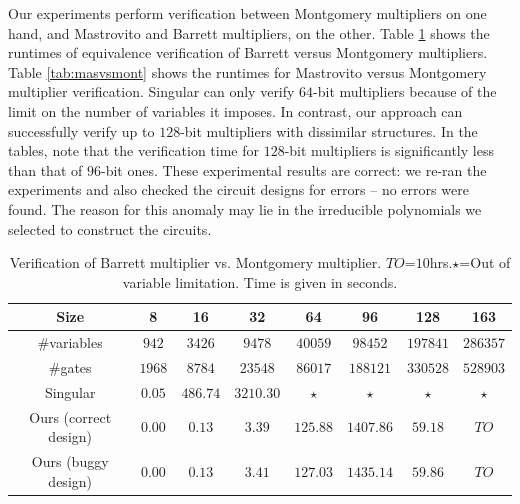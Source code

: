 Our experiments perform verification between Montgomery multipliers on
one hand, and  Mastrovito and Barrett multipliers, on the other. Table
\ref{tab:bvsmont} shows the runtimes of equivalence verification of
Barrett versus Montgomery multipliers. Table \ref{tab:masvsmont} shows
the runtimes for Mastrovito versus Montgomery multiplier verification.  
Singular can only verify $64$-bit multipliers because of the limit on
the number of variables it imposes. In contrast, our approach can
successfully verify up to $128$-bit multipliers with dissimilar
structures. In the tables, note that the verification time for
$128$-bit multipliers is significantly less than that of
$96$-bit ones. These experimental results are correct: we re-ran the
experiments and also checked the circuit designs for errors -- no
errors were found. The reason for this anomaly may lie in the
irreducible polynomials we selected to construct the circuits.  


\begin{table}[t]
\begin{center}
\caption{ Verification of Barrett multiplier vs. Montgomery multiplier. $TO$=$10$hrs.$\star$=Out of variable limitation.
Time is given in seconds.}
\label{tab:bvsmont}
\begin{tabular}{|c||c|c|c|c|c|c|c|} \hline 
Size   			&8  		&16       	&32       	&64         &96   		&128		&163	\\
\hline 
\#variables 	&$942$ 		&$3426$ 	&$9478$ 	&$40059$ 	&$98452$ 	&$197841$ 	&$286357$ 	\\
\hline 
\#gates 		&$1968$  	&$8784$    	&$23548$   	&$86017$    &$188121$  	&$330528$	&$528903$\\
\hline
Singular		&$0.05$  	&$486.74$   &$3210.30$  &$\star$   	&$\star$ 	&$\star$ 	&$\star$	\\
\hline
\hline
Ours (correct design)   	&$0.00$  	&$0.13$   	&$3.39$  	&$125.88$  &$1407.86$  &$59.18$		&$TO$ \\
\hline{}
Ours (buggy design)			&$0.00$  	&$0.13$   	&$3.41$  	&$127.03$  &$1435.14$  &$59.86$		&$TO$ \\
\hline
\end{tabular}
\end{center}
\end{table}

